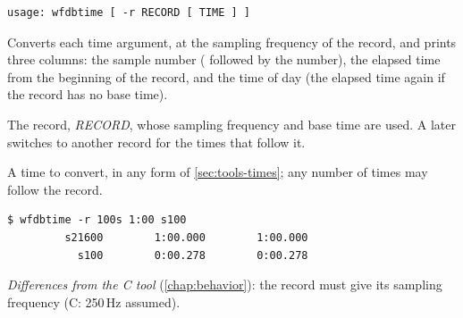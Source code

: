 \begin{lstlisting}[style=signature,language={}]
usage: wfdbtime [ -r RECORD [ TIME ] ]
\end{lstlisting}
Converts each time argument, at the sampling frequency of the record, and prints three
columns: the sample number ( followed by the number), the elapsed time from the
beginning of the record, and the time of day (the elapsed time again if the record has no
base time).
\begin{params}
\item[-r] The record, \textit{RECORD}, whose sampling frequency and base time are used. A
  later  switches to another record for the times that follow it.
\item[TIME] A time to convert, in any form of \cref{sec:tools-times}; any number of times
  may follow the record.
\end{params}
\begin{lstlisting}[style=text]
$ wfdbtime -r 100s 1:00 s100
         s21600        1:00.000        1:00.000
           s100        0:00.278        0:00.278
\end{lstlisting}
\textit{Differences from the C tool} (\cref{chap:behavior}): the record must give its
sampling frequency (C: 250\,Hz assumed).

